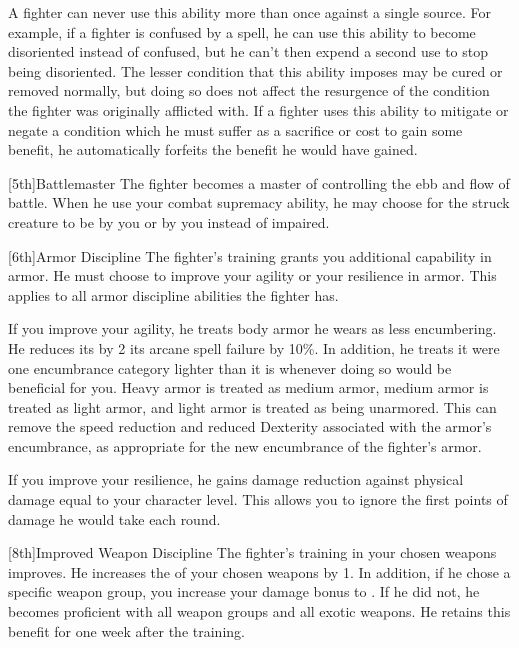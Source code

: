         \par A fighter can never use this ability more than once against a single source.
        For example, if a fighter is confused by a  spell, he can use this ability to become disoriented instead of confused, but he can't then expend a second use to stop being disoriented.
        The lesser condition that this ability imposes may be cured or removed normally, but doing so does not affect the resurgence of the condition the fighter was originally afflicted with.
        If a fighter uses this ability to mitigate or negate a condition which he must suffer as a sacrifice or cost to gain some benefit, he automatically forfeits the benefit he would have gained.

        [5th]{Battlemaster}
        The fighter becomes a master of controlling the ebb and flow of battle.
        When he use your combat supremacy ability, he may choose for the struck creature to be \goaded by you or \shaken by you instead of impaired.

        [6th]{Armor Discipline}
        The fighter's training grants you additional capability in armor.
        He must choose to improve your agility or your resilience in armor.
        This applies to all armor discipline abilities the fighter has.

        If you improve your agility, he treats body armor he wears as less encumbering.
        He reduces its  by 2 its arcane spell failure by 10\%.
        In addition, he treats it were one encumbrance category lighter than it is whenever doing so would be beneficial for you.
        Heavy armor is treated as medium armor, medium armor is treated as light armor, and light armor is treated as being unarmored.
        This can remove the speed reduction and reduced Dexterity associated with the armor's encumbrance, as appropriate for the new encumbrance of the fighter's armor.

        If you improve your resilience, he gains damage reduction against physical damage equal to your character level. This allows you to ignore the first points of damage he would take each round.

        [8th]{Improved Weapon Discipline}
        The fighter's training in your chosen weapons improves.
        He increases the  of your chosen weapons by 1.
        In addition, if he chose a specific weapon group, you increase your damage bonus to .
        If he did not, he becomes proficient with all weapon groups and all exotic weapons.
        He retains this benefit for one week after the training.

